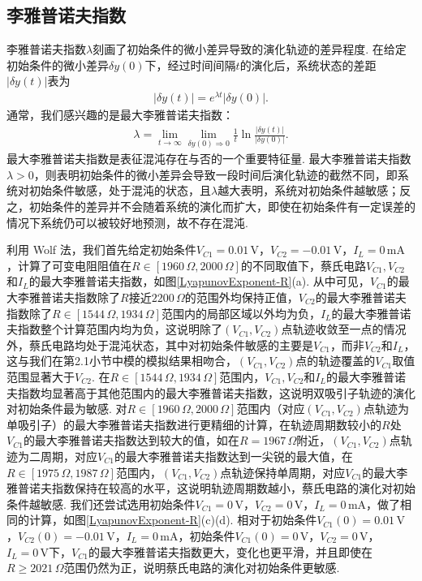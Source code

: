 \documentclass[a4paper, 10pt]{article}
\providecommand{\abs}[1]{\left\lvert#1\right\rvert} %
\begin{document}
\begin{multicols*}{2}
\subsection{李雅普诺夫指数}
李雅普诺夫指数$\lambda$刻画了初始条件的微小差异导致的演化轨迹的差异程度. 在给定初始条件的微小差异$\delta y(0)$下，经过时间间隔$t$的演化后，系统状态的差距$\abs{\delta y(t)}$表为
\begin{align}
    \abs{\delta y(t)}=e^{\lambda t}\abs{\delta y(0)}.
\end{align}
通常，我们感兴趣的是最大李雅普诺夫指数：
\begin{align}
    \lambda=\lim_{t\rightarrow\infty}\lim_{\delta y(0)\Rightarrow 0}\frac{1}{t}\ln\frac{\abs{\delta y(t)}}{\abs{\delta y(0)}}.
\end{align}
最大李雅普诺夫指数是表征混沌存在与否的一个重要特征量. 最大李雅普诺夫指数$\lambda>0$，则表明初始条件的微小差异会导致一段时间后演化轨迹的截然不同，即系统对初始条件敏感，处于混沌的状态，且$\lambda$越大表明，系统对初始条件越敏感；反之，初始条件的差异并不会随着系统的演化而扩大，即使在初始条件有一定误差的情况下系统仍可以被较好地预测，故不存在混沌.

利用 Wolf 法\cite{wolf1985determining}，我们首先给定初始条件$V_{C1}=0.01\,\mathrm{V}$，$V_{C2}=-0.01\,\mathrm{V}$，$I_L=0\,\mathrm{mA}$，计算了可变电阻阻值在$R\in[1960\,\Omega,2000\,\Omega]$的不同取值下，蔡氏电路$V_{C1},V_{C2}$和$I_L$的最大李雅普诺夫指数，如图\ref{LyapunovExponent-R}(a). 从中可见，$V_{C1}$的最大李雅普诺夫指数除了$R$接近$2200\,\Omega$的范围外均保持正值，$V_{C2}$的最大李雅普诺夫指数除了$R\in[1544\,\Omega,1934\,\Omega]$范围内的局部区域以外均为负，$I_L$的最大李雅普诺夫指数整个计算范围内均为负，这说明除了$(V_{C1},V_{C2})$点轨迹收敛至一点的情况外，蔡氏电路均处于混沌状态，其中对初始条件敏感的主要是$V_{C1}$，而非$V_{C2}$和$I_L$，这与我们在第2.1小节中模的模拟结果相吻合，$(V_{C1},V_{C2})$点的轨迹覆盖的$V_{C1}$取值范围显著大于$V_{C2}$. 在$R\in[1544\,\Omega,1934\,\Omega]$范围内，$V_{C1},V_{C2}$和$I_L$的最大李雅普诺夫指数均显著高于其他范围内的最大李雅普诺夫指数，这说明双吸引子轨迹的演化对初始条件最为敏感. 对$R\in[1960\,\Omega,2000\,\Omega]$范围内（对应$(V_{C1},V_{C2})$点轨迹为单吸引子）的最大李雅普诺夫指数进行更精细的计算，在轨迹周期数较小的$R$处$V_{C1}$的最大李雅普诺夫指数达到较大的值，如在$R=1967\,\Omega$附近，$(V_{C1},V_{C2})$点轨迹为二周期，对应$V_{C1}$的最大李雅普诺夫指数达到一尖锐的最大值，在$R\in[1975\,\Omega,1987\,\Omega]$范围内，$(V_{C1},V_{C2})$点轨迹保持单周期，对应$V_{C1}$的最大李雅普诺夫指数保持在较高的水平，这说明轨迹周期数越小，蔡氏电路的演化对初始条件越敏感. 我们还尝试选用初始条件$V_{C1}=0\,\mathrm{V}$，$V_{C2}=0\,\mathrm{V}$，$I_L=0\,\mathrm{mA}$，做了相同的计算，如图\ref{LyapunovExponent-R}(c)(d). 相对于初始条件$V_{C1}(0)=0.01\,\mathrm{V}$，$V_{C2}(0)=-0.01\,\mathrm{V}$，$I_L=0\,\mathrm{mA}$，初始条件$V_{C1}(0)=0\,\mathrm{V}$，$V_{C2}=0\,\mathrm{V}$，$I_L=0\,\mathrm{V}$下，$V_{C1}$的最大李雅普诺夫指数更大，变化也更平滑，并且即使在$R\geq 2021\,\Omega$范围仍然为正，说明蔡氏电路的演化对初始条件更敏感.


\end{multicols*}
\end{document}
